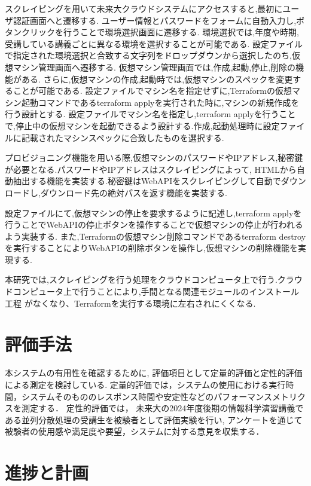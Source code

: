 \documentclass[11pt]{ujarticle}\sloppy
\begin{document}
スクレイピングを用いて未来大クラウドシステムにアクセスすると,最初にユーザ認証画面へと遷移する.
ユーザー情報とパスワードをフォームに自動入力し,ボタンクリックを行うことで環境選択画面に遷移する.
環境選択では,年度や時期,受講している講義ごとに異なる環境を選択することが可能である.
設定ファイルで指定された環境選択と合致する文字列をドロップダウンから選択したのち,仮想マシン管理画面へ遷移する.
仮想マシン管理画面では,作成,起動,停止,削除の機能がある.
さらに,仮想マシンの作成,起動時では,仮想マシンのスペックを変更することが可能である.
設定ファイルでマシン名を指定せずに,Terraformの仮想マシン起動コマンドであるterraform applyを実行された時に,マシンの新規作成を行う設計とする.
設定ファイルでマシン名を指定し,terraform applyを行うことで,停止中の仮想マシンを起動できるよう設計する.作成,起動処理時に設定ファイルに記載されたマシンスペックに合致したものを選択する.

プロビジョニング機能を用いる際,仮想マシンのパスワードやIPアドレス,秘密鍵が必要となる.パスワードやIPアドレスはスクレイピングによって,
HTMLから自動抽出する機能を実装する.秘密鍵はWebAPIをスクレイピングして自動でダウンロードし,ダウンロード先の絶対パスを返す機能を実装する.


設定ファイルにて,仮想マシンの停止を要求するように記述し,terraform applyを行うことでWebAPIの停止ボタンを操作することで仮想マシンの停止が行われるよう実装する.
また,Terraformの仮想マシン削除コマンドであるterraform destroyを実行することによりWebAPIの削除ボタンを操作し,仮想マシンの削除機能を実現する.


本研究では,スクレイピングを行う処理をクラウドコンピュータ上で行う.クラウドコンピュータ上で行うことにより,手間となる関連モジュールのインストール工程
がなくなり、Terraformを実行する環境に左右されにくくなる.



\section{評価手法}

本システムの有用性を確認するために,
評価項目として定量的評価と定性的評価による測定を検討している.
定量的評価では，システムの使用における実行時間，システムそのもののレスポンス時間や安定性などのパフォーマンスメトリクスを測定する．
定性的評価では，
未来大の2024年度後期の情報科学演習講義である並列分散処理の受講生を被験者として評価実験を行い,
アンケートを通じて被験者の使用感や満足度や要望，システムに対する意見を収集する．



\section{進捗と計画}
\end{document}
